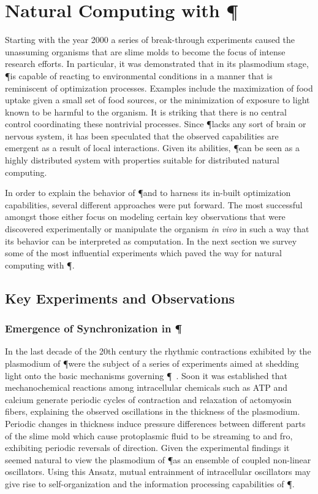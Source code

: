 
\section{Natural Computing with \P}\label{sec:natural_computing_physarum}

	Starting with the year 2000 a series of break-through experiments caused the unassuming organisms that are slime molds to become the focus of intense research efforts. In particular, it was demonstrated that in its plasmodium stage, \P is capable of reacting to environmental conditions in a manner that is reminiscent of optimization processes. Examples include the maximization of food uptake given a small set of food sources, or the minimization of exposure to light known to be harmful to the organism. It is striking that there is no central control coordinating these nontrivial processes. Since \P lacks any sort of brain or nervous system, it has been speculated that the observed capabilities are emergent as a result of local interactions. Given its abilities, \P can be seen as a highly distributed system with properties suitable for distributed natural computing.

	In order to explain the behavior of \P and to harness its in-built optimization capabilities, several different approaches were put forward. The most successful amongst those either focus on modeling certain key observations that were discovered experimentally or manipulate the organism \textit{in vivo} in such a way that its behavior can be interpreted as computation. In the next section we survey some of the most influential experiments which paved the way for natural computing with \P.

	\subsection{Key Experiments and Observations}

		\subsubsection{Emergence of Synchronization in \P }\label{sec:oscillator_experiment}
		
			In the last decade of the 20th century the rhythmic contractions exhibited by the plasmodium of \P were the subject of a series of experiments aimed at shedding light onto the basic mechanisms governing \P~\cite{MIYAKE1996341,NAKAGAKI1996261,TAKAHASHI1997105}. Soon it was established that mechanochemical reactions among intracellular chemicals such as ATP and calcium generate periodic cycles of contraction and relaxation of actomyosin fibers, explaining the observed oscillations in the thickness of the plasmodium. Periodic changes in thickness induce pressure differences between different parts of the slime mold which cause protoplasmic fluid to be streaming to and fro, exhibiting periodic reversals of direction. Given the experimental findings it seemed natural to view the plasmodium of \P as an ensemble of coupled non-linear oscillators. Using this Ansatz, mutual entrainment of intracellular oscillators may give rise to self-organization and the information processing capabilities of \P. 

